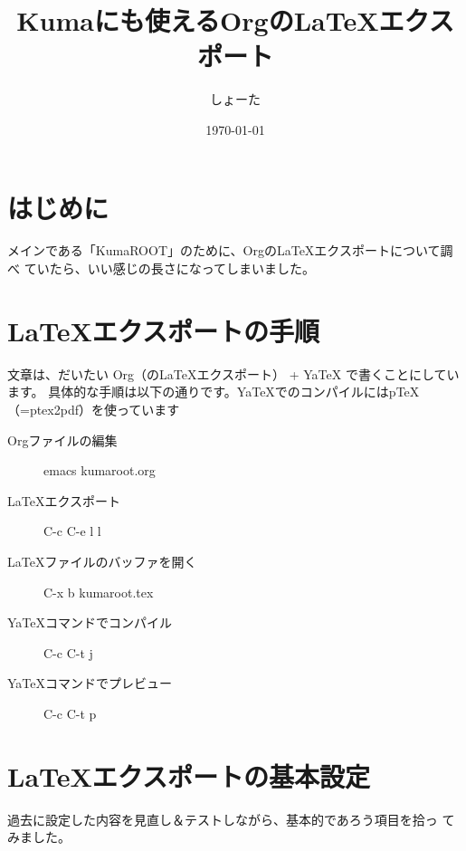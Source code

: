 \documentclass[dvipdfmx,12pt]{jsarticle}
\author{しょーた}
\date{\today}
\title{Kumaにも使えるOrgの\LaTeX{}エクスポート}
\begin{document}
\maketitle
\tableofcontents


\section{はじめに}
\label{sec-1}

メインである「KumaROOT」のために、Orgの\LaTeX{}エクスポートについて調べ
ていたら、いい感じの長さになってしまいました。

\section{\LaTeX{}エクスポートの手順}
\label{sec-2}

文章は、だいたい Org（の\LaTeX{}エクスポート） + YaTeX で書くことにしています。
具体的な手順は以下の通りです。YaTeXでのコンパイルにはpTeX（=ptex2pdf）を使っています

\begin{description}
\item[{Orgファイルの編集}] emacs kumaroot.org
\item[{\LaTeX{}エクスポート}] C-c C-e l l
\item[{\LaTeX{}ファイルのバッファを開く}] C-x b kumaroot.tex
\item[{YaTeXコマンドでコンパイル}] C-c C-t j
\item[{YaTeXコマンドでプレビュー}] C-c C-t p
\end{description}

\section{\LaTeX{}エクスポートの基本設定}
\label{sec-3}

過去に設定した内容を見直し＆テストしながら、基本的であろう項目を拾っ
てみました。
\end{document}
